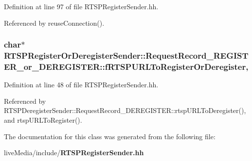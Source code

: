 Definition at line 97 of file R\+T\+S\+P\+Register\+Sender.\+hh.



Referenced by reuse\+Connection().

\subsubsection[{f\+R\+T\+S\+P\+U\+R\+L\+To\+Register\+Or\+Deregister}]{\setlength{\rightskip}{0pt plus 5cm}char$\ast$ R\+T\+S\+P\+Register\+Or\+Deregister\+Sender\+::\+Request\+Record\+\_\+\+R\+E\+G\+I\+S\+T\+E\+R\+\_\+or\+\_\+\+D\+E\+R\+E\+G\+I\+S\+T\+E\+R\+::f\+R\+T\+S\+P\+U\+R\+L\+To\+Register\+Or\+Deregister\hspace{0.3cm}{\ttfamily [protected]}, {\ttfamily [inherited]}}\label{classRTSPRegisterOrDeregisterSender_1_1RequestRecord__REGISTER__or__DEREGISTER_a0f64ba313a2cc03bc1b9f4219ee992c8}


Definition at line 48 of file R\+T\+S\+P\+Register\+Sender.\+hh.



Referenced by R\+T\+S\+P\+Deregister\+Sender\+::\+Request\+Record\+\_\+\+D\+E\+R\+E\+G\+I\+S\+T\+E\+R\+::rtsp\+U\+R\+L\+To\+Deregister(), and rtsp\+U\+R\+L\+To\+Register().



The documentation for this class was generated from the following file\+:\begin{DoxyCompactItemize}
\item 
live\+Media/include/{\bf R\+T\+S\+P\+Register\+Sender.\+hh}\end{DoxyCompactItemize}
